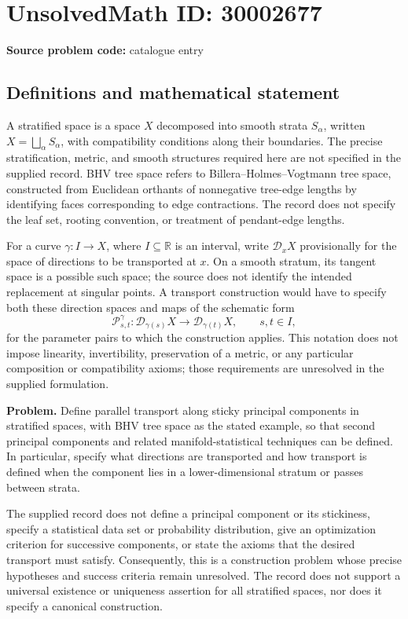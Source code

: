 \documentclass[11pt]{article}
\newcommand{\R}{\mathbb{R}}
\begin{document}
\section*{UnsolvedMath ID: 30002677}
\textbf{Source problem code:} catalogue entry
\subsection{Definitions and mathematical statement}
A stratified space is a space \(X\) decomposed into smooth strata \(S_\alpha\), written \(X=\bigsqcup_\alpha S_\alpha\), with compatibility conditions along their boundaries. The precise stratification, metric, and smooth structures required here are not specified in the supplied record. BHV tree space refers to Billera--Holmes--Vogtmann tree space, constructed from Euclidean orthants of nonnegative tree-edge lengths by identifying faces corresponding to edge contractions. The record does not specify the leaf set, rooting convention, or treatment of pendant-edge lengths.

For a curve \(\gamma:I\to X\), where \(I\subseteq\R\) is an interval, write \(\mathcal D_xX\) provisionally for the space of directions to be transported at \(x\). On a smooth stratum, its tangent space is a possible such space; the source does not identify the intended replacement at singular points. A transport construction would have to specify both these direction spaces and maps of the schematic form
\[
\mathcal P^\gamma_{s,t}:\mathcal D_{\gamma(s)}X\longrightarrow\mathcal D_{\gamma(t)}X,
\qquad s,t\in I,
\]
for the parameter pairs to which the construction applies. This notation does not impose linearity, invertibility, preservation of a metric, or any particular composition or compatibility axioms; those requirements are unresolved in the supplied formulation.

\textbf{Problem.} Define parallel transport along sticky principal components in stratified spaces, with BHV tree space as the stated example, so that second principal components and related manifold-statistical techniques can be defined. In particular, specify what directions are transported and how transport is defined when the component lies in a lower-dimensional stratum or passes between strata.

The supplied record does not define a principal component or its stickiness, specify a statistical data set or probability distribution, give an optimization criterion for successive components, or state the axioms that the desired transport must satisfy. Consequently, this is a construction problem whose precise hypotheses and success criteria remain unresolved. The record does not support a universal existence or uniqueness assertion for all stratified spaces, nor does it specify a canonical construction.
\end{document}
